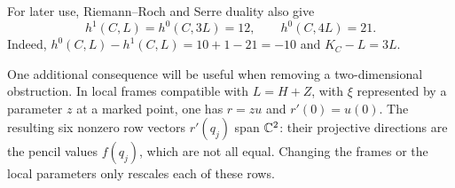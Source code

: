 For later use, Riemann--Roch and Serre duality also give
\begin{equation}\label{curve:boundary-cohomology}
 h^1(C,L)=h^0(C,3L)=12,\qquad h^0(C,4L)=21.
\end{equation}
Indeed, $h^0(C,L)-h^1(C,L)=10+1-21=-10$ and
$K_C-L=3L$.

One additional consequence will be useful when removing a
two-dimensional obstruction.  In local frames compatible with
$L=H+Z$, with $\xi$ represented by a parameter $z$ at a marked point,
one has $r=zu$ and
$r'(0)=u(0)$.  The resulting six nonzero row vectors $r'(q_j)$ span
$\mathbb C^2$: their projective directions are the pencil values $f(q_j)$,
which are not all equal.  Changing the frames or the local parameters
only rescales each of these rows.
